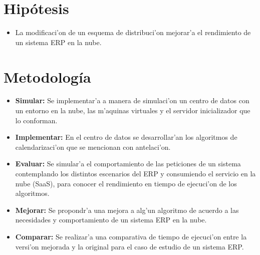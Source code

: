 
\chapter*{Hip\'otesis}


\begin{itemize}
\item La modificaci'on de un esquema de distribuci'on mejorar'a el rendimiento de un sistema ERP en la nube.
\end{itemize}


\chapter*{Metodolog\'ia}



\begin{itemize}
\item \textbf{Simular:} Se implementar'a a manera de simulaci'on un centro de datos con un entorno en la nube, las m'aquinas virtuales y el servidor inicializador que lo conforman.
\item \textbf{Implementar:} En el centro de datos se desarrollar'an los algoritmos de calendarizaci'on que se mencionan con antelaci'on.
\item \textbf{Evaluar:} Se simular'a el comportamiento de las peticiones de un sistema contemplando los distintos escenarios del ERP y consumiendo el servicio en la nube (SaaS), para conocer el rendimiento en tiempo de ejecuci'on de los algoritmos.
\item \textbf{Mejorar:} Se propondr'a una mejora a alg'un algoritmo de acuerdo a las necesidades y comportamiento de un sistema ERP en la nube.
\item \textbf{Comparar:} Se realizar'a una comparativa de tiempo de ejecuci'on entre la versi'on mejorada y la original para el caso de estudio de un sistema ERP.
\end{itemize}